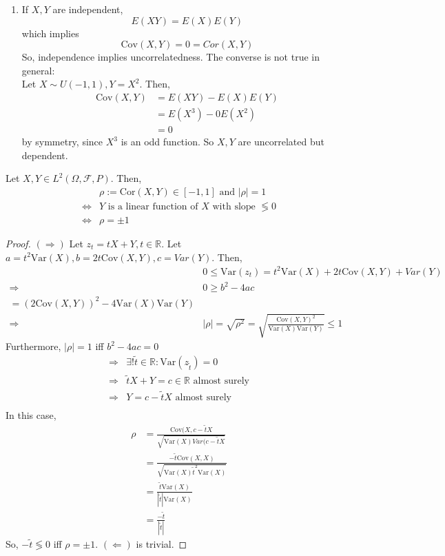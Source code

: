 \documentclass{article}
\newcommand{\R}{\mathbb{R}}
\newcommand{\Var}{\mathrm{Var}}
\newcommand{\Cov}{\mathrm{Cov}}
\newcommand{\Cor}{\text{Cor}}
\begin{document}
\begin{myrem}{}{}
\begin{enumerate}
				\item If $X, Y$ are independent, $$E(XY)=E(X)E(Y)$$ which implies $$\Cov(X, Y)=0=Cor(X, Y)$$
				So, independence implies uncorrelatedness. The converse is not true in general:\\
				
				Let $X\sim U(-1, 1), Y=X^2$. Then,\
				\begin{align*}
					\Cov(X, Y)&=E(XY)-E(X)E(Y)\\
					&=E(X^3)-0E(X^2)\\
					&=0
				\end{align*}
				by symmetry, since $X^3$ is an odd function. So $X, Y$ are uncorrelated but dependent.
			\end{enumerate}
		\end{myrem}
		
		\begin{myprop}{}{}
			Let $X, Y\in L^2(\Omega, \mathcal{F}, P)$. Then,
			\begin{align*}
				&\rho:=\Cor(X, Y)\in[-1, 1]\mbox{ and }|\rho|=1\\
				\Leftrightarrow&Y\mbox{ is a linear function of $X$ with slope }\lessgtr0\\
				\Leftrightarrow&\rho=\pm1
			\end{align*}
			
			\begin{proof}
				$(\Rightarrow)$ Let $z_t=tX+Y, t\in\R$. Let $a=t^2\Var(X), b=2t\Cov(X, Y), c=Var(Y)$. Then,
				\begin{align*}
					&0\leq\Var(z_t)=t^2\Var(X)+2t\Cov(X, Y)+Var(Y)\\
					\Rightarrow&0\geq b^2-4ac\\=(2\Cov(X, Y))^2-4\Var(X)\Var(Y)\\
					\Rightarrow&|\rho|=\sqrt{\rho^2}=\sqrt{\frac{\Cov(X, Y)^2}{\Var(X)\Var(Y)}}\leq1
				\end{align*}
				Furthermore, $|\rho|=1$ iff $b^2-4ac=0$
				\begin{align*}
					\Rightarrow&\exists!\tilde{t}\in\R: \Var(z_{\tilde{t}})=0\\
					\Rightarrow&\tilde{t}X+Y=c\in\R\mbox{ almost surely}\\
					\Rightarrow&Y=c-\tilde{t}X\mbox{ almost surely}\\
				\end{align*}
				In this case,
				\begin{align*}
					\rho&=\frac{\Cov(X, c-\tilde{t}X}{\sqrt{\Var(X)Var(c-\tilde{t}X}}\\
					&=\frac{-\tilde{t}\Cov(X, X)}{\sqrt{\Var(X)\tilde{t}^2\Var(X)}}\\
					&=\frac{\tilde{t}\Var(X)}{|\tilde{t}|\Var(X)}\\
					&=\frac{-\tilde{t}}{|\tilde{t}|}
				\end{align*}
				So, $-\tilde{t}\lessgtr0$ iff $\rho=\pm1$. $(\Leftarrow)$ is trivial.
			\end{proof}
		\end{myprop}
		
\end{document}

